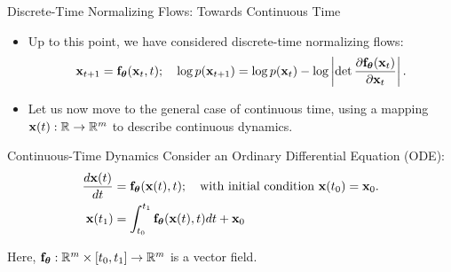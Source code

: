 \documentclass{beamer}
\begin{document}
\begin{frame}{Discrete-Time Normalizing Flows: Towards Continuous Time}
	\begin{itemize}
		\item Up to this point, we have considered discrete-time normalizing flows:
		\vspace{-0.3cm}
		 \[
		 	 \mathbf{x}_{t+1} = \mathbf{f}_{\boldsymbol{\theta}}(\mathbf{x}_t, t); \quad \log p(\mathbf{x}_{t+1}) = \log p(\mathbf{x}_{t}) - \log \left| \det \frac{\partial \mathbf{f}_{\boldsymbol{\theta}}(\mathbf{x}_t)}{\partial \mathbf{x}_{t}} \right| .
		 \]
		\item Let us now move to the general case of continuous time, using a mapping $\mathbf{x}(t): \mathbb{R} \rightarrow \mathbb{R}^m$ to describe continuous dynamics.
	\end{itemize}
	\begin{block}{Continuous-Time Dynamics}
		Consider an Ordinary Differential Equation (ODE):
		\vspace{-0.3cm}
		\begin{align*}
		   \frac{d \mathbf{x}(t)}{dt} &= \mathbf{f}_{\boldsymbol{\theta}}(\mathbf{x}(t), t); \quad \text{with initial condition }\mathbf{x}(t_0) = \mathbf{x}_0. \\
		   \mathbf{x}(t_1) &= \int^{t_1}_{t_0} \mathbf{f}_{\boldsymbol{\theta}}(\mathbf{x}(t), t) d t  + \mathbf{x}_0
		\end{align*}
		\vspace{-0.6cm}
	\end{block}
	Here, $\mathbf{f}_{\boldsymbol{\theta}}: \mathbb{R}^m \times [t_0, t_1] \rightarrow \mathbb{R}^m$ is a vector field.
\end{frame}
\end{document}
